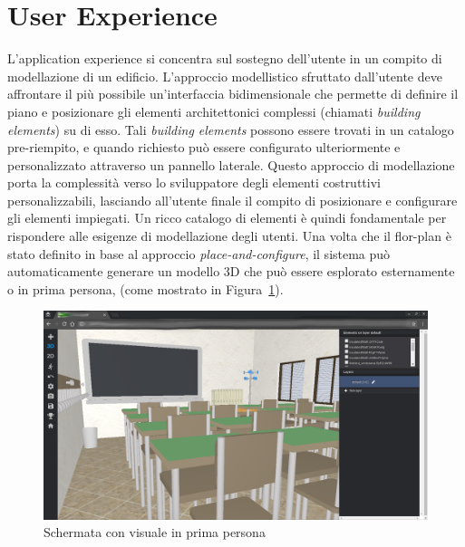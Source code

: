 \section{User Experience}
\label{sec:chapter_2_section_1}


L'application experience si concentra sul sostegno dell'utente in un compito di modellazione di un edificio.
L'approccio modellistico sfruttato dall'utente deve affrontare il pi\`u possibile un'interfaccia bidimensionale che permette
di definire il piano e posizionare gli elementi architettonici complessi (chiamati \emph{building elements}) su di esso.
Tali \emph{building elements} possono essere trovati in un catalogo pre-riempito, e quando richiesto pu\`o essere
configurato ulteriormente e personalizzato attraverso un pannello laterale. Questo approccio
di modellazione porta la complessit\`a verso lo sviluppatore degli elementi costruttivi personalizzabili,
lasciando all'utente finale il compito di posizionare e configurare gli elementi impiegati.
Un ricco catalogo di elementi \`e quindi fondamentale per rispondere alle esigenze di modellazione degli utenti.
Una volta che il flor-plan \`e stato definito in base al approccio \emph{place-and-configure}, il sistema pu\`o automaticamente
generare un modello 3D che pu\`o essere esplorato esternamente o in prima persona,
(come mostrato in Figura~\ref{fig:3D-school}).\\

\begin{figure}[htbp] %
   \centering
   \includegraphics[width=1\linewidth]{images/3d-school}
   \caption{Schermata con visuale in prima persona}
   \label{fig:3D-school}
\end{figure}

